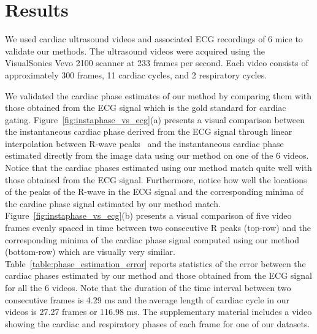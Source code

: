 \documentclass[journal]{IEEEtran}
\begin{document}
\section{Results}
\label{sec:results}
%
We used cardiac ultrasound videos and associated ECG recordings of 6 mice to validate our methods. The ultrasound videos were acquired using the VisualSonics Vevo 2100 scanner at 233 frames per second. Each video consists of approximately 300 frames, 11 cardiac cycles, and 2 respiratory cycles.

	We validated the cardiac phase estimates of our method by comparing them with those obtained from the ECG signal which is the gold standard for cardiac gating. Figure~\ref{fig:instaphase_vs_ecg}(a) presents a visual comparison between the instantaneous cardiac phase derived from the ECG signal through linear interpolation between R-wave peaks~\cite{Rosenblum2001,Freund2003} and the instantaneous cardiac phase estimated directly from the image data using our method on one of the 6 videos. Notice that the cardiac phases estimated using our method match quite well with those obtained from the ECG signal. Furthermore, notice how well the locations of the peaks of the R-wave in the ECG signal and the corresponding minima of the cardiac phase signal estimated by our method match. 	Figure~\ref{fig:instaphase_vs_ecg}(b) presents a visual comparison of five video frames evenly spaced in time between two consecutive R peaks (top-row) and the corresponding minima of the cardiac phase signal computed using our method (bottom-row) which are visually very similar. Table~\ref{table:phase_estimation_error} reports statistics of the error between the cardiac phases estimated by our method and those obtained from the ECG signal for all the 6 videos. Note that the duration of the time interval between two consecutive frames is 4.29 ms and the average length of cardiac cycle in our videos is 27.27 frames or 116.98 ms. The supplementary material includes a video showing the cardiac and respiratory phases of each frame for one of our datasets.
\end{document}
